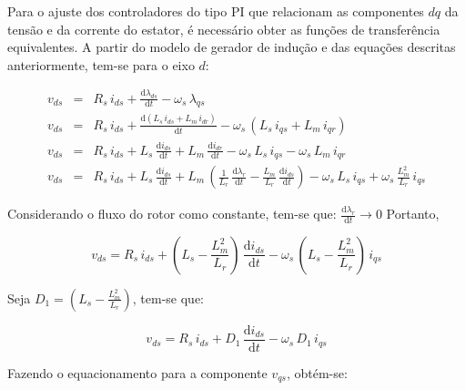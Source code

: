 Para o ajuste dos controladores do tipo \ac{PI} que relacionam as componentes $dq$ da tensão e da corrente do estator, é necessário obter as funções de transferência equivalentes. A partir do modelo de gerador de indução e das equações descritas anteriormente, tem-se para o eixo $d$:

\begin{eqnarray}
  v_{ds} &=& R_{s}\,i_{ds} + \frac{\mathrm{d} \lambda_{ds}}{\mathrm{d} t} - \omega_{s}\,\lambda_{qs}
  \\
  v_{ds} &=& R_{s}\,i_{ds} + \frac{\mathrm{d} (L_s\,i_{ds} + L_m\,i_{dr})}{\mathrm{d} t} - \omega_{s}\,(L_s\,i_{qs} + L_m\,i_{qr})
  \\
  v_{ds} &=& R_{s}\,i_{ds} + L_{s}\,\frac{\mathrm{d} i_{ds}}{\mathrm{d} t} + L_{m}\,\frac{\mathrm{d} i_{dr}}{\mathrm{d} t} - \omega_{s}\,L_s\,i_{qs} - \omega_{s}\,L_m\,i_{qr}
  \\
  v_{ds} &=& R_{s}\,i_{ds} + L_{s}\,\frac{\mathrm{d} i_{ds}}{\mathrm{d} t} + L_{m}\,\left(\frac{1}{L_r}\,\frac{\mathrm{d} \lambda_{r}}{\mathrm{d} t} - \frac{L_m}{L_r}\,\frac{\mathrm{d} i_{ds}}{\mathrm{d} t}\right) - \omega_{s}\,L_s\,i_{qs} + \omega_{s}\,\frac{L_m^2}{L_r}\,i_{qs}
  \label{eq:equac_vds}
\end{eqnarray}

Considerando o fluxo do rotor como constante, tem-se que: $ \frac{\mathrm{d} \lambda_{r}}{\mathrm{d} t} \rightarrow 0 $
Portanto,

\begin{equation}
\label{eq:vds}
  v_{ds} = R_{s}\,i_{ds} + \left (L_s - \frac{L_m^2}{L_r} \right)\,\frac{\mathrm{d} i_{ds}}{\mathrm{d} t} - \omega_{s}\,\left (L_s - \frac{L_m^2}{L_r} \right)\,i_{qs}
\end{equation}

Seja $ D_1 = \left (L_s - \frac{L_m^2}{L_r} \right) $, tem-se que:

\begin{equation}
\label{eq:vds}
  v_{ds} = R_{s}\,i_{ds} + D_1\,\frac{\mathrm{d} i_{ds}}{\mathrm{d} t} - \omega_{s}\,D_1\,i_{qs}
\end{equation}


Fazendo o equacionamento para a componente $v_{qs}$, obtém-se:

